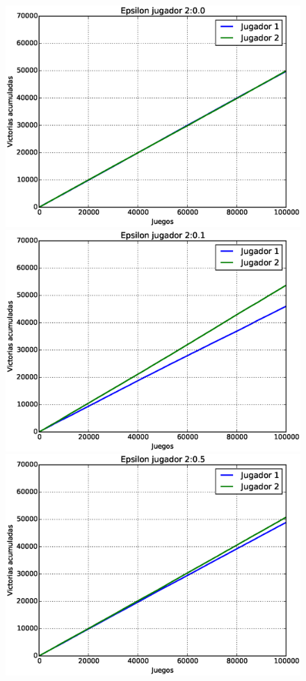 \documentclass[11pt, spanish]{article}
\begin{document}
\begin{figure}
\centering
\includegraphics[scale = 0.3]{figuras/Epsilon00.eps}
\includegraphics[scale = 0.3]{figuras/Epsilon01.eps}\\
\includegraphics[scale = 0.3]{figuras/Epsilon05.eps}

\end{figure}
\end{document}
